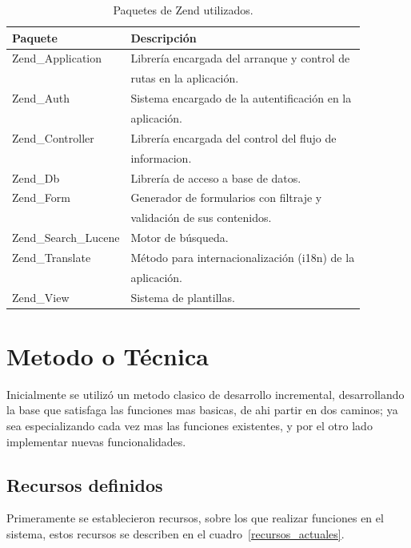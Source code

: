 \documentclass[letter,12pt]{article}
\begin{document}
\begin{table}
\begin{tabular}{l|l}
Paquete & Descripción \\
\hline
Zend\_Application     & Librería encargada del arranque y control de    \\
					  & rutas en la aplicación. \\
Zend\_Auth            & Sistema encargado de la autentificación en la   \\
					  & aplicación. \\
Zend\_Controller      & Librería encargada del control del flujo de     \\
				      & informacion. \\
Zend\_Db              & Librería de acceso a base de datos. \\
Zend\_Form            & Generador de formularios con filtraje y         \\
					  & validación de sus contenidos. \\
Zend\_Search\_Lucene  & Motor de búsqueda. \\
Zend\_Translate       & Método para internacionalización (i18n) de la   \\
				      & aplicación. \\
Zend\_View            & Sistema de plantillas. \\
\end{tabular}
\caption{Paquetes de Zend utilizados.}
\label{herramientas_zend}
\end{table}

\section{Metodo o Técnica}
Inicialmente se utilizó un metodo clasico de desarrollo incremental, de\-sa\-rro\-llan\-do la
base que satisfaga las funciones mas basicas, de ahi partir en dos caminos; ya sea especializando cada vez mas las funciones existentes, y por el otro lado implementar nuevas funcionalidades.

\subsection{Recursos definidos}
Primeramente se establecieron recursos, sobre los que realizar funciones en el sistema, estos
recursos se describen en el cuadro~\ref{recursos_actuales}.
\end{document}

